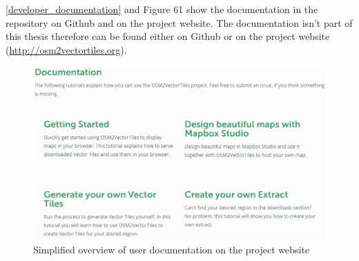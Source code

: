 \autoref{developer_documentation} and Figure 61 show the documentation in the repository on Github and on the project website. The documentation isn't part of this thesis therefore can be found either on Github or on the project website (\url{http://osm2vectortiles.org}).

\begin{figure}[H]
  \centering
  \includegraphics[width=1.0\textwidth]{images/documentation/user_documentation}
  \caption{Simplified overview of user documentation on the project website}
  \label{user_documentation}
\end{figure}